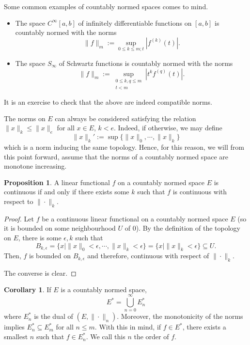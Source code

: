 \documentclass[]{article}
\theoremstyle{definition}
\newtheorem{corollary}{Corollary}[theorem]
\theoremstyle{definition}
\newtheorem{proposition}{Proposition}[section]
\begin{document}
Some common examples of countably normed spaces comes to mind. 
\begin{itemize}
  \item The space \(C^\infty[a, b]\) of infinitely differentiable functions 
    on \([a, b]\) is countably normed with the norms 
    \[\|f\|_m := \sup_{0 \le k \le m; t} |f^{(k)}(t)|.\]
  \item The space \(S_\infty\) of Schwartz functions is countably normed 
    with the norms 
    \[\|f\|_m := \sup_{\substack{0 \le k, q \le m\\ t < m}}|t^k f^{(q)}(t)|.\]
\end{itemize}
It is an exercise to check that the above are indeed compatible norms. 

The norms on \(E\) can always be considered satisfying the relation 
\(\|x\|_k \le \|x\|_e\) for all \(x \in E\), \(k < e\). Indeed, if otherwise, 
we may define 
\[\|x\|_k' := \sup\{\|x\|_0, \cdots, \|x\|_k\}\]
which is a norm inducing the same topology. Hence, for this reason, we will 
from this point forward, assume that the norms of a countably normed space are 
monotone increasing.

\begin{proposition}
  A linear functional \(f\) on a countably normed space \(E\) is continuous if and only 
  if there exists some \(k\) such that \(f\) is continuous with respect to 
  \(\|\cdot\|_k\).
\end{proposition}
\begin{proof}
  Let \(f\) be a continuous linear functional on a countably normed space \(E\) 
  (so it is bounded on some neighbourhood \(U\) of 0). By the definition of the 
  topology on \(E\), there is some \(\epsilon, k\) such that 
  \[B_{k, \epsilon} = \{x \mid \|x\|_0 < \epsilon, \cdots, 
    \|x\|_k < \epsilon\} = \{x \mid \|x\|_k < \epsilon\} \subseteq U.\]
  Then, \(f\) is bounded on \(B_{k, \epsilon}\) and therefore, continuous with 
  respect of \(\|\cdot\|_k\). 
  
  The converse is clear.
\end{proof}

\begin{corollary}
  If \(E\) is a countably normed space, 
  \[E^* = \bigcup_{n = 0}^\infty E_n^*\]
  where \(E_n^*\) is the dual of \((E, \|\cdot\|_n)\). Moreover, the monotonicity 
  of the norms implies \(E_n^* \subseteq E_m^*\) for all \(n \le m\). 
  With this in mind, if \(f \in E^*\), there exists a smallest \(n\) such that 
  \(f \in E_n^*\). We call this \(n\) the order of \(f\).
\end{corollary}
\end{document}
